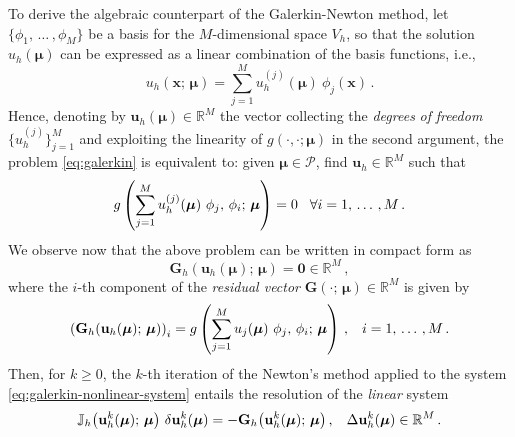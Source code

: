 \documentclass[12pt, a4paper, twoside, openright]{report}
\numberwithin{equation}{chapter}
\theoremstyle{theorem}
\theoremstyle{definition}
\theoremstyle{remark}
\theoremstyle{proposition}
\numberwithin{figure}{chapter}
\newcommand{\bg}[1]{\boldsymbol{#1}}
\begin{document}
		To derive the algebraic counterpart of the Galerkin-Newton method, let $\big\lbrace \phi_1, \, \ldots \, , \phi_M \big\rbrace$ be a basis for the $M$-dimensional space $V_h$, so that the solution $u_h(\bg{\mu})$ can be expressed as a linear combination of the basis functions, i.e.,
		\begin{equation}
			\label{eq:galerkin-solution}
			u_h(\bg{x}; \, \bg{\mu}) = \sum_{j = 1}^M u_h^{(j)}(\bg{\mu}) ~ \phi_j(\bg{x}) \, .
		\end{equation} 
		Hence, denoting by $\mathbf{u}_h(\bg{\mu}) \in \mathbb{R}^M$ the vector collecting the \emph{degrees} \emph{of} \emph{freedom} $\big\lbrace u_h^{(j)} \big\rbrace_{j = 1}^M$ and exploiting the linearity of $g(\cdot,\cdot; \bg{\mu})$ in the second argument, the problem \eqref{eq:galerkin} is equivalent to: given $\bg{\mu} \in \mathcal{P}$, find $\mathbf{u}_h \in \mathbb{R}^M$ such that
		\begin{equation}
			\label{eq:galerkin-algebraic}
			g \left( \sum_{j = 1}^M u_h^{(j)}(\bg{\mu}) ~ \phi_j, \, \phi_i; \, \bg{\mu} \right) = 0 \hspace*{0.3cm} \forall i = 1, \, \ldots \, , M \, .
		\end{equation}
		We observe now that the above problem can be written in compact form as
		\begin{equation}
			\label{eq:galerkin-nonlinear-system}
			\mathbf{G}_h (\mathbf{u}_h(\bg{\mu}); \, \bg{\mu}) = \bg{0} \in \mathbb{R}^M \, ,
		\end{equation}
		where the $i$-th component of the \emph{residual vector} $\mathbf{G}(\cdot; \, \bg{\mu}) \in \mathbb{R}^M$ is given by
		\begin{equation}
			\label{eq:galerkin-nonlinear-system-equation}
			\left( \mathbf{G}_h(\mathbf{u}_h(\bg{\mu}); \, \bg{\mu}) \right)_i = g \left( \sum_{j = 1}^M u_j(\bg{\mu}) ~ \phi_j, \, \phi_i; \, \bg{\mu} \right) \, , \hspace*{0.3cm} i = 1, \, \ldots \, , M \, .
		\end{equation}
		Then, for $k \geq 0$, the $k$-th iteration of the Newton's method applied to the system \eqref{eq:galerkin-nonlinear-system} entails the resolution of the \emph{linear} system
		\begin{equation}
			\label{eq:galerkin-linear-system}
			\mathbb{J}_h \big( \mathbf{u}^k_h(\bg{\mu}); \, \bg{\mu} \big) ~ \delta \mathbf{u}^k_h(\bg{\mu}) = - \mathbf{G}_h \big( \mathbf{u}^k_h(\bg{\mu}); \, \bg{\mu} \big) \, , \hspace*{0.3cm} \Delta \mathbf{u}^k_h(\bg{\mu}) \in \mathbb{R}^M \, .
		\end{equation}
\end{document}
